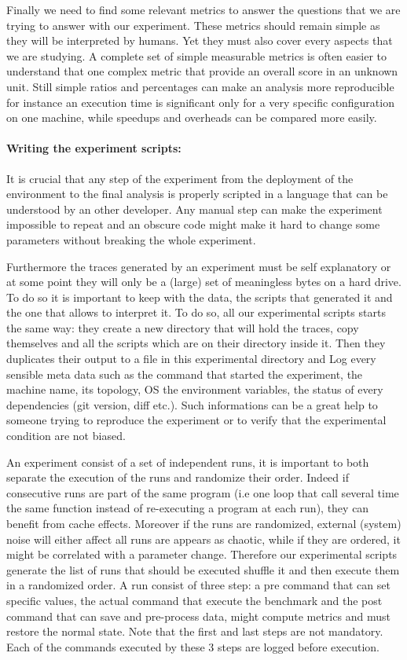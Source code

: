 Finally we need to find some relevant metrics to answer the questions that we are trying to answer with our experiment.
These metrics should remain simple as they will be interpreted by humans.
Yet they must also cover every aspects that we are studying.
A complete set of simple measurable metrics is often easier to understand that one complex metric that provide an overall score in an unknown unit.
Still simple ratios and percentages can make an analysis more reproducible for instance an execution time is significant only for a very specific configuration on one machine, while speedups and overheads can be compared more easily.


\paragraph{Writing the experiment scripts:}

It is crucial that any step of the experiment from the deployment of the
environment to the final analysis is properly scripted in a language that can
be understood by an other developer. Any manual step can make the experiment
impossible to repeat and an obscure code might make it hard to change some
parameters without breaking the whole experiment.

Furthermore the traces generated by an experiment must be self explanatory or
at some point they will only be a (large) set of meaningless bytes on a hard
drive. To do so it is important to keep with the data, the scripts
that generated it and the one that allows to interpret it. To do so, all our
experimental scripts starts the same way: they create a new directory that
will hold the traces, copy themselves and all the scripts which are on their
directory inside it. Then they duplicates their output to a file in this
experimental directory and Log every sensible meta data such as the
command that started the experiment, the machine name, its topology, \gls{OS}
the environment variables, the status of every dependencies (git version, diff
etc.). Such informations can be a great help to someone trying to reproduce
the experiment or to verify that the experimental condition are not biased.

An experiment consist of a set of independent runs, it is important to both
separate the execution of the runs and randomize their order. Indeed if
consecutive runs are part of the same program (i.e one loop that call several
time the same function instead of re-executing a program at each run), they
can benefit from cache effects. Moreover if the runs are randomized, external
(system) noise will either affect all runs are appears as chaotic, while if
they are ordered, it might be correlated with a parameter change.
Therefore our experimental scripts generate the list of runs that should be
executed shuffle it and then execute them in a randomized order. A run
consist of three step: a pre command that can set specific values,
the actual command that execute the benchmark and the post command that can
save and pre-process data, might compute metrics and must restore the normal state. Note that
the first and last steps are not mandatory. Each of the commands executed by
these 3 steps are logged before execution.

